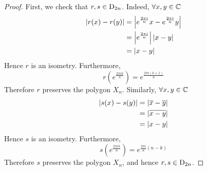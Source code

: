 \documentclass{article}
\begin{document}
\begin{proof}
    First, we check that $r, s \in \mathrm{D}_{2n}$. Indeed, $\forall x, y \in \mathbb{C}$
    \begin{align*}
        \left\lvert r(x) - r(y)\right\rvert &= \left\lvert e^\frac{2\pi i}{n}x - e^\frac{2\pi i}{n}y\right\rvert \\
        &= \left\lvert e^\frac{2\pi i}{n}\right\rvert\left\lvert x - y\right\rvert \\
        &= \left\lvert x - y\right\rvert
    \end{align*}
    Hence $r$ is an isometry. Furthermore,
    \[
        r(e^\frac{2\pi i k}{n}) =  e^\frac{2\pi i (k+1)}{n}
    \]
    Therefore $r$ preserves the polygon $X_n$. Similarly, $\forall x, y \in \mathbb{C}$
    \begin{align*}
        \left\lvert s(x) - s(y)\right\rvert &= \left\lvert \overline{x} - \overline{y}\right\rvert \\
        &= \left\lvert \overline{x - y}\right\rvert \\
        &= \left\lvert x - y\right\rvert
    \end{align*}
    Hence $s$ is an isometry. Furthermore,
    \[
        s(e^\frac{2\pi i k}{n}) =  e^{\frac{2\pi i}{n}(n - k)}
    \]
    Therefore $s$ preserves the polygon $X_n$, and hence $r, s \in \mathrm{D}_{2n}$.


\end{proof}
\end{document}
